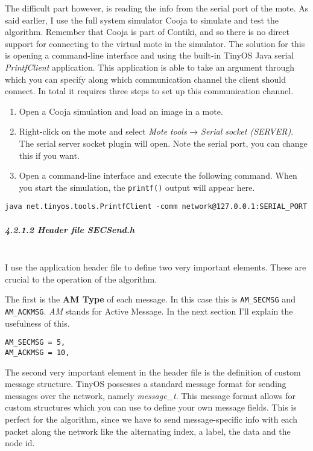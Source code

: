 The difficult part however, is reading the info from the serial port of
the mote. As said earlier, I use the full system simulator Cooja to
simulate and test the algorithm. Remember that Cooja is part of Contiki,
and so there is no direct support for connecting to the virtual mote in
the simulator. The solution for this is opening a command-line interface
and using the built-in TinyOS Java serial \emph{PrintfClient}
application. This application is able to take an argument through which
you can specify along which communication channel the client should
connect. In total it requires three steps to set up this communication
channel.

\begin{enumerate}
\def\labelenumi{\arabic{enumi}.}
\itemsep1pt\parskip0pt
\item
  Open a Cooja simulation and load an image in a mote.
\item
  Right-click on the mote and select \emph{Mote tools} → \emph{Serial
  socket (SERVER)}. The serial server socket plugin will open. Note the
  serial port, you can change this if you want.
\item
  Open a command-line interface and execute the following command. When
  you start the simulation, the \texttt{printf()} output will appear
  here.
\end{enumerate}

\begin{verbatim}
java net.tinyos.tools.PrintfClient -comm network@127.0.0.1:SERIAL_PORT
\end{verbatim}

\subparagraph{4.2.1.2 Header file
\emph{SECSend.h}\\\\}\label{header-file-secsend.h}

I use the application header file to define two very important elements.
These are crucial to the operation of the algorithm.

The first is the \textbf{AM Type} of each message. In this case this is
\texttt{AM\_SECMSG} and \texttt{AM\_ACKMSG}. \emph{AM} stands for Active
Message. In the next section I'll explain the usefulness of this.

\begin{verbatim}
AM_SECMSG = 5,
AM_ACKMSG = 10,
\end{verbatim}

The second very important element in the header file is the definition
of custom message structure. TinyOS possesses a standard message format
for sending messages over the network, namely \emph{message\_t}. This
message format allows for custom structures which you can use to define
your own message fields. This is perfect for the algorithm, since we
have to send message-specific info with each packet along the network
like the alternating index, a label, the data and the node id.

